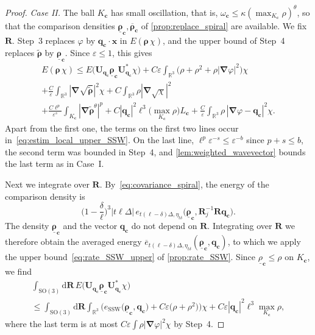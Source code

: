 \documentclass[final,reqno]{amsart}
\theoremstyle{remark}
\renewcommand{\le}{\leqslant}
\renewcommand{\epsilon}{\varepsilon}
\newcommand{\ol}[1]{\overline{#1}}
\newcommand{\ul}[1]{\underline{#1}}
\newcommand{\wt}[1]{\widetilde{#1}}
\newcommand{\RR}{\mathbb{R}}
\newcommand{\SO}{\mathrm{SO}}
\newcommand{\SSW}{\mathrm{SSW}}
\newcommand{\grad}{\bm{\nabla}}
\newcommand{\tetra}{\mathbb{\Delta}}
\newcommand{\dd}{\mathrm{d}}
\begin{document}
\begin{proof}
\noindent\emph{Case II.} The ball $K_{\mathbf{c}}$ has small oscillation, that is, $\omega_{\mathbf{c}}\le\kappa(\max_{K_{\mathbf{c}}}\rho)^\theta$, so that the comparison densities $\ul{\bm{\rho}}_{\mathbf{c}},\ol{\bm{\rho}}_{\mathbf{c}}$ of \cref{prop:replace_spiral} are available. We fix $\mathbf{R}$. Step~3 replaces $\varphi$ by $\mathbf{q}_{\mathbf{c}}\cdot\mathbf{x}$ in $E(\bm{\rho}\,\chi)$, and the upper bound of Step~4 replaces $\wt{\bm{\rho}}$ by $\ul{\bm{\rho}}_{\mathbf{c}}$. Since $\epsilon\le1$, this gives
\begin{multline*}
E(\bm{\rho}\,\chi)\le E\big(\mathbf{U}_{\mathbf{q}_{\mathbf{c}}}\ul{\bm{\rho}}_{\mathbf{c}}\mathbf{U}_{\mathbf{q}_{\mathbf{c}}}^*\chi\big)+C\epsilon\int_{\RR^3}\big(\rho+\rho^2+\rho|\grad\varphi|^2\big)\chi\\
+\frac C\epsilon\int_{\RR^3}|\grad\sqrt{\wt{\bm{\rho}}}|^2\chi+C\int_{\RR^3}\rho|\grad\sqrt\chi|^2\\
+\frac{C\ell^p}{\epsilon^s}\int_{K_{\mathbf{c}}}|\grad\wt{\bm{\rho}}^\theta|^p+C|\mathbf{q}_{\mathbf{c}}|^2\ell^3\Big(\max_{K_{\mathbf{c}}}\rho\Big)L_{\mathbf{c}}+\frac C\epsilon\int_{\RR^3}\rho\,|\grad\varphi-\mathbf{q}_{\mathbf{c}}|^2\chi.
\end{multline*}
Apart from the first one, the terms on the first two lines occur in~\cref{eq:estim_local_upper_SSW}. On the last line, $\ell^p\epsilon^{-s}\le\epsilon^{-b}$ since $p+s\le b$, the second term was bounded in Step~4, and \cref{lem:weighted_wavevector} bounds the last term as in Case~I.

Next we integrate over $\mathbf{R}$. By~\cref{eq:covariance_spiral}, the energy of the comparison density is
$$
\Big(1-\frac\delta\ell\Big)^3|t\ell\tetra|\,e_{t(\ell-\delta)\tetra,\eta_{t\delta}}\big(\ul{\bm{\rho}}_{\mathbf{c}},\mathbf{R}_j^{-1}\mathbf{R}\mathbf{q}_{\mathbf{c}}\big).
$$
The density $\ul{\bm{\rho}}_{\mathbf{c}}$ and the vector $\mathbf{q}_{\mathbf{c}}$ do not depend on $\mathbf{R}$. Integrating over $\mathbf{R}$ we therefore obtain the averaged energy $\ol{e}_{t(\ell-\delta)\tetra,\eta_{t\delta}}(\ul{\bm{\rho}}_{\mathbf{c}},\mathbf{q}_{\mathbf{c}})$, to which we apply the upper bound~\cref{eq:rate_SSW_upper} of \cref{prop:rate_SSW}. Since $\ul{\rho}_{\mathbf{c}}\le\rho$ on $K_{\mathbf{c}}$, we find
\begin{multline*}
\int_{\SO(3)}\dd\mathbf{R}\,E\big(\mathbf{U}_{\mathbf{q}_{\mathbf{c}}}\ul{\bm{\rho}}_{\mathbf{c}}\mathbf{U}_{\mathbf{q}_{\mathbf{c}}}^*\chi\big)\\
\le\int_{\SO(3)}\dd\mathbf{R}\int_{\RR^3}\Big(e_\SSW\big(\ul{\bm{\rho}}_{\mathbf{c}},\mathbf{q}_{\mathbf{c}}\big)+C\epsilon\big(\rho+\rho^2\big)\Big)\chi+C\epsilon|\mathbf{q}_{\mathbf{c}}|^2\ell^3\max_{K_{\mathbf{c}}}\rho,
\end{multline*}
where the last term is at most $C\epsilon\int\rho|\grad\varphi|^2\chi$ by Step~4.


\end{proof}
\end{document}
